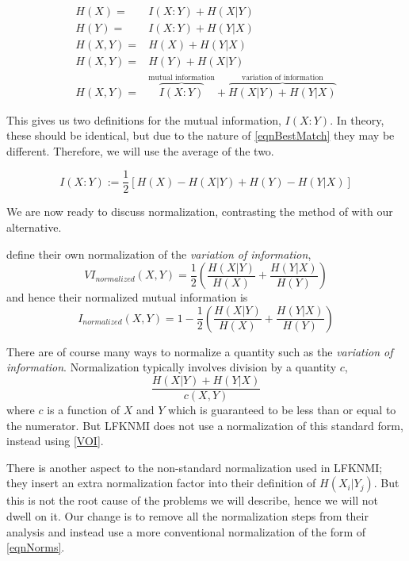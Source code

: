 \documentclass[9pt,technote]{IEEEtran}
\begin{document}
\begin{align*}
	H(X) = & I(X:Y) + H(X|Y) \\
	H(Y) = & I(X:Y) + H(Y|X) \\
	H(X,Y) = & H(X) + H(Y|X) \\
	H(X,Y) = & H(Y) + H(X|Y) \\
	H(X,Y) = & \overbrace{I(X:Y)}^\text{mutual information} + \overbrace{H(X|Y) + H(Y|X)}^\text{variation of information}
\end{align*}

This gives us two definitions for the mutual information, $I(X:Y)$.
In theory, these should be identical, but due to the nature of \cref{eqnBestMatch}
they may be different. Therefore, we will use the average of the two.

\begin{equation}
	I(X:Y) := \frac12 \left[ H(X)-H(X|Y) + H(Y)-H(Y|X) \right]
	\label{eqnAverageOfTwo}
\end{equation}

We are now ready to discuss normalization, contrasting the method of \lfk
with our alternative.

\citet{lancichinetti-2009} define their own normalization of the \emph{variation of information},
\begin{equation}
	VI_{normalized}(X,Y) = \frac12 \left(  \frac{ H(X|Y) }{ H(X) } + \frac{ H(Y|X) }{ H(Y) } \right)   \label{VOI}
\end{equation}
and hence their normalized mutual information is
\begin{equation}
	I_{normalized}(X,Y) = 1 - \frac12 \left(  \frac{ H(X|Y) }{ H(X) } + \frac{ H(Y|X) }{ H(Y) } \right) %
\end{equation}

There are of course many ways to normalize a quantity such as the \emph{variation of information}.
Normalization typically involves division by a quantity $c$,
\begin{equation}
	\frac{ H(X|Y) + H(Y|X) } {c(X,Y)} \label{eqnNorms}
\end{equation}
where $c$ is a function of $X$ and $Y$ which is guaranteed to be less than or equal to the numerator.
But LFKNMI does not use a normalization of this standard form, instead using \cref{VOI}.

There is another aspect to the non-standard normalization used in LFKNMI;
they insert an extra normalization factor into their definition of $H(X_i|Y_j)$.
But this is not the root cause of the problems we will describe, hence we will not dwell on it.
Our change is to remove all the normalization steps from their analysis and instead
use a more conventional normalization of the form of \cref{eqnNorms}.
\end{document}
